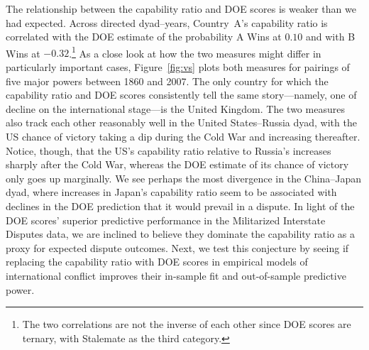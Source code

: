 The relationship between the capability ratio and DOE scores is weaker than we had expected.
Across directed dyad--years, Country~A's capability ratio is correlated with the DOE estimate of the probability A Wins at $0.10$ and with B Wins at $-0.32$.\footnote{
  The two correlations are not the inverse of each other since DOE scores are ternary, with Stalemate as the third category.
}
As a close look at how the two measures might differ in particularly important cases, Figure~\ref{fig:vs} plots both measures for pairings of five major powers between 1860 and 2007.
The only country for which the capability ratio and DOE scores consistently tell the same story---namely, one of decline on the international stage---is the United Kingdom.
The two measures also track each other reasonably well in the United States--Russia dyad, with the US chance of victory taking a dip during the Cold War and increasing thereafter.
Notice, though, that the US's capability ratio relative to Russia's increases sharply after the Cold War, whereas the DOE estimate of its chance of victory only goes up marginally.
We see perhaps the most divergence in the China--Japan dyad, where increases in Japan's capability ratio seem to be associated with declines in the DOE prediction that it would prevail in a dispute.
In light of the DOE scores' superior predictive performance in the Militarized Interstate Disputes data, we are inclined to believe they dominate the capability ratio as a proxy for expected dispute outcomes.
Next, we test this conjecture by seeing if replacing the capability ratio with DOE scores in empirical models of international conflict improves their in-sample fit and out-of-sample predictive power.

